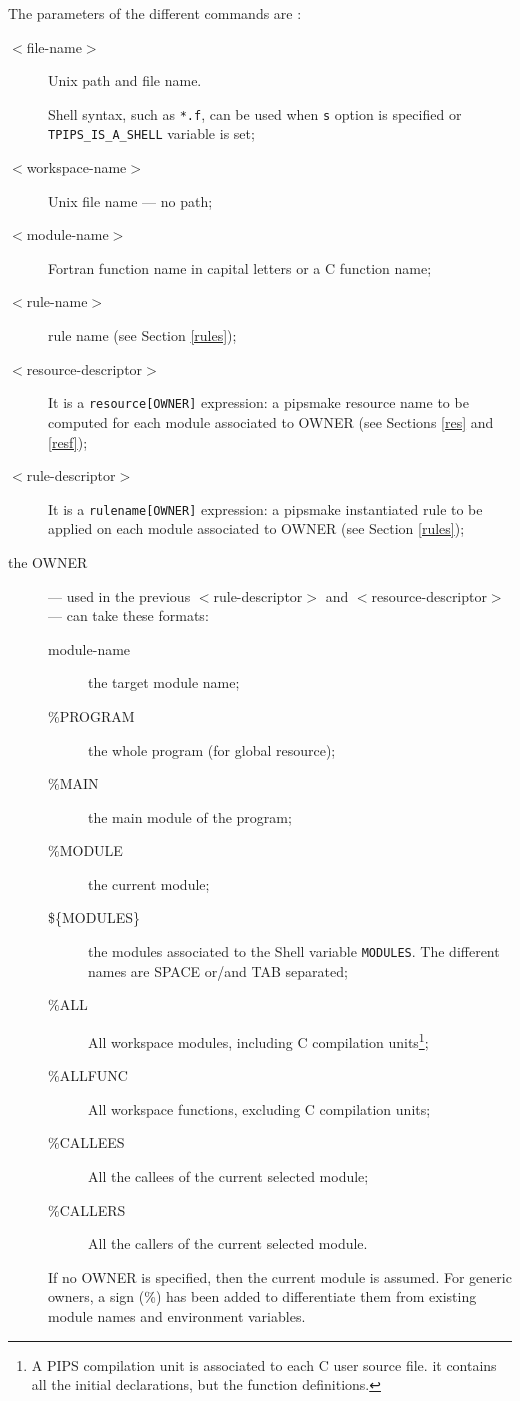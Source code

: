 \documentclass[a4paper]{article}
\begin{document}
The parameters of the different commands are :
\begin{description}
\item [$<$file-name$>$] Unix path and file name.
  \par Shell syntax, such as \verb+*.f+, can be used when \verb+s+ option
  is specified or \verb+TPIPS_IS_A_SHELL+ variable is set;

\item [$<$workspace-name$>$] Unix file name --- no path;

\item [$<$module-name$>$] Fortran function name in capital letters or a C
  function name;

\item [$<$rule-name$>$] rule name (see Section \ref{rules});

\item [$<$resource-descriptor$>$] It is a \verb+resource[OWNER]+
  expression: a pipsmake resource name to be computed for each module
  associated to OWNER (see Sections \ref{res} and \ref{resf});

\item [$<$rule-descriptor$>$] It is a \verb+rulename[OWNER]+ expression: a
  pipsmake instantiated rule to be applied on each module associated to
  OWNER (see Section \ref{rules});

\item [the OWNER] --- used in the previous $<$rule-descriptor$>$ and
$<$resource-descriptor$>$ --- can take these formats:
\begin{description}
\item [module-name] the target module name;
\item [\%PROGRAM] the whole program (for global resource);
\item [\%MAIN] the main module of the program;
\item [\%MODULE] the current module;
\item [\$\{MODULES\}] the modules associated to the Shell variable
  {\tt MODULES}. The different names are SPACE or/and TAB separated;
\item [\%ALL] All workspace modules, including C compilation
units\footnote{A PIPS compilation unit is associated to each C user
source file. it contains all the initial declarations, but the
function definitions.};
\item [\%ALLFUNC] All workspace functions, excluding C compilation units;
\item [\%CALLEES] All the callees of the current selected module;
\item [\%CALLERS] All the callers of the current selected module.
\end{description}
If no OWNER is specified, then the current  module is assumed. For
generic owners, a  sign (\%) has been added to differentiate them
from existing module names and environment variables.

\end{description}
\end{document}
